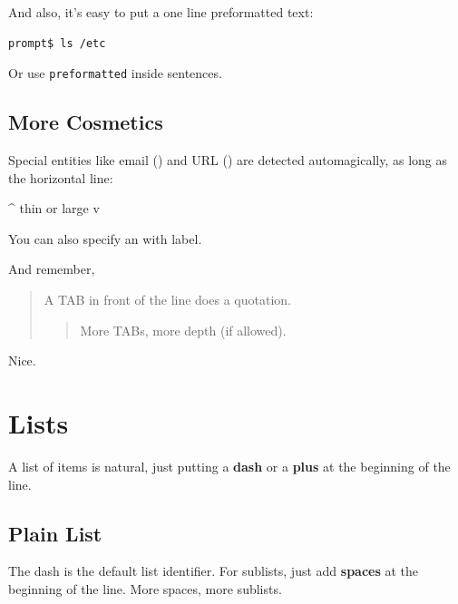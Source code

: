 \documentclass[11pt,a4paper]{article}
\begin{document}
And also, it's easy to put a one line preformatted
text:

\begin{verbatim}
prompt$ ls /etc
\end{verbatim}

Or use \texttt{preformatted} inside sentences.

\subsection*{More Cosmetics}
Special entities like email () and
URL () are detected automagically,
as long as the horizontal line:


\hrulefill{}

\^{} thin or large v

\clearpage

You can also specify an 
with label.

And remember,

	\begin{quotation}
A TAB in front of the line does a quotation.
		\begin{quotation}
More TABs, more depth (if allowed).
		\end{quotation}
	\end{quotation}
Nice.


\section*{Lists}
A list of items is natural, just putting a \textbf{dash} or
a \textbf{plus} at the beginning of the line.

\subsection*{Plain List}
The dash is the default list identifier. For sublists,
just add \textbf{spaces} at the beginning of the line. More
spaces, more sublists.
\end{document}
